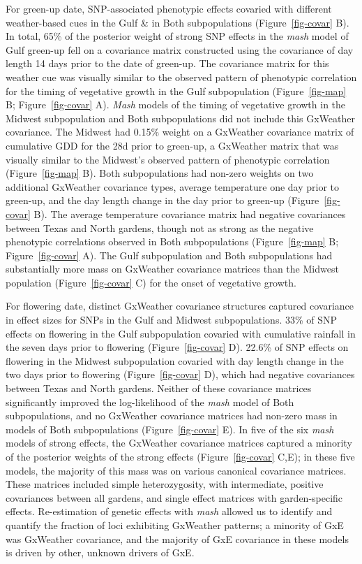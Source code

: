 \documentclass[
  9pt,
  twocolumn,
  twoside]{simple-article}%
\begin{document}
For green-up date, SNP-associated phenotypic effects covaried with
different weather-based cues in the Gulf \& in Both subpopulations
(Figure~\ref{fig-covar} B). In total, 65\% of the posterior weight of
strong SNP effects in the \emph{mash} model of Gulf green-up fell on a
covariance matrix constructed using the covariance of day length 14 days
prior to the date of green-up. The covariance matrix for this weather
cue was visually similar to the observed pattern of phenotypic
correlation for the timing of vegetative growth in the Gulf
subpopulation (Figure~\ref{fig-map} B; Figure~\ref{fig-covar} A).
\emph{Mash} models of the timing of vegetative growth in the Midwest
subpopulation and Both subpopulations did not include this GxWeather
covariance. The Midwest had 0.15\% weight on a GxWeather covariance
matrix of cumulative GDD for the 28d prior to green-up, a GxWeather
matrix that was visually similar to the Midwest's observed pattern of
phenotypic correlation (Figure~\ref{fig-map} B). Both subpopulations had
non-zero weights on two additional GxWeather covariance types, average
temperature one day prior to green-up, and the day length change in the
day prior to green-up (Figure~\ref{fig-covar} B). The average
temperature covariance matrix had negative covariances between Texas and
North gardens, though not as strong as the negative phenotypic
correlations observed in Both subpopulations (Figure~\ref{fig-map} B;
Figure~\ref{fig-covar} A). The Gulf subpopulation and Both
subpopulations had substantially more mass on GxWeather covariance
matrices than the Midwest population (Figure~\ref{fig-covar} C) for the
onset of vegetative growth.

For flowering date, distinct GxWeather covariance structures captured
covariance in effect sizes for SNPs in the Gulf and Midwest
subpopulations. 33\% of SNP effects on flowering in the Gulf
subpopulation covaried with cumulative rainfall in the seven days prior
to flowering (Figure~\ref{fig-covar} D). 22.6\% of SNP effects on
flowering in the Midwest subpopulation covaried with day length change
in the two days prior to flowering (Figure~\ref{fig-covar} D), which had
negative covariances between Texas and North gardens. Neither of these
covariance matrices significantly improved the log-likelihood of the
\emph{mash} model of Both subpopulations, and no GxWeather covariance
matrices had non-zero mass in models of Both subpopulations
(Figure~\ref{fig-covar} E). In five of the six \emph{mash} models of
strong effects, the GxWeather covariance matrices captured a minority of
the posterior weights of the strong effects (Figure~\ref{fig-covar}
C,E); in these five models, the majority of this mass was on various
canonical covariance matrices. These matrices included simple
heterozygosity, with intermediate, positive covariances between all
gardens, and single effect matrices with garden-specific effects.
Re-estimation of genetic effects with \emph{mash} allowed us to identify
and quantify the fraction of loci exhibiting GxWeather patterns; a
minority of GxE was GxWeather covariance, and the majority of GxE
covariance in these models is driven by other, unknown drivers of GxE.
\end{document}
